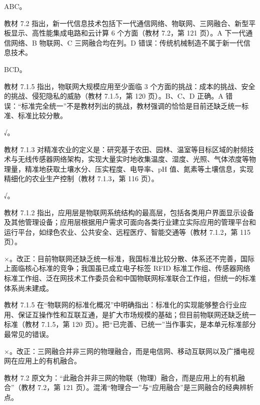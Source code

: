 \documentclass[a4paper,11pt]{article}
\begin{document}
\q ABC。\begin{analysis}教材 7.2 指出，新一代信息技术包括下一代通信网络、物联网、三网融合、新型平板显示、高性能集成电路和云计算 6 个方面（教材 7.2，第 121 页）。A 下一代通信网络、B 物联网、C 三网融合均在列。D 错误：传统机械制造不属于新一代信息技术。\end{analysis}

\q BCD。\begin{analysis}教材 7.1.5 指出，物联网大规模应用至少面临 3 个方面的挑战：成本的挑战、安全的挑战、侵犯隐私的威胁（教材 7.1.5，第 120 页）。B、C、D 正确。A 错误：“标准完全统一”不是教材列出的挑战，教材强调的恰恰是目前还缺乏统一标准、标准比较分散。\end{analysis}


\q √。\begin{analysis}教材 7.1.3 对精准农业的定义是：研究基于农田、园林、温室等目标区域的射频技术与无线传感器网络架构，实现大量实时地收集温度、湿度、光照、气体浓度等物理量，精准地获取土壤水分、压实程度、电导率、pH 值、氮素等土壤信息，实现精细化的农业生产控制（教材 7.1.3，第 116 页）。\end{analysis}

\q √。\begin{analysis}教材 7.1.2 指出，应用层是物联网系统结构的最高层，包括各类用户界面显示设备及其他管理设备；应用层根据用户需求可面向各类行业建立实际应用的管理平台和运行平台，如绿色农业、公共安全、远程医疗、智能交通等（教材 7.1.2，第 115 页）。\end{analysis}

\q ×。改正：目前物联网还缺乏统一标准，我国标准比较分散、体系还不完善，国际上面临核心标准的竞争；我国虽已成立电子标签 RFID 标准工作组、传感器网络标准工作组、泛在网技术工作委员会和中国物联网标准联合工作组，但统一的标准体系尚未建成。\begin{analysis}教材 7.1.5 在“物联网的标准化概况”中明确指出：标准化的实现能够整合行业应用、保证互操作性和互联互通，是扩大市场规模的基础；但目前物联网还缺乏统一标准（教材 7.1.5，第 120 页）。把“已完善、已统一”当作事实，是本单元标准部分最常见的错误。\end{analysis}

\q ×。改正：三网融合并非三网的物理融合，而是电信网、移动互联网以及广播电视网在应用上的有机融合。\begin{analysis}教材 7.2 原文为：“此融合并非三网的物联（物理）融合，而是应用上的有机融合”（教材 7.2，第 121 页）。混淆“物理合一”与“应用融合”是三网融合的经典辨析点。\end{analysis}
\end{document}
